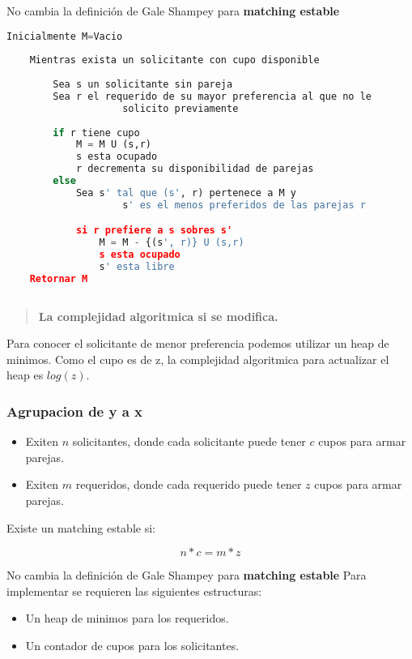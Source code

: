 \documentclass{article}
\begin{document}
No cambia la definición de Gale Shampey para \textbf{matching estable}

\begin{lstlisting}[language=Python, caption=Algoritmo de requeridos con cupos]
    Inicialmente M=Vacio
    
    Mientras exista un solicitante con cupo disponible
    
        Sea s un solicitante sin pareja
        Sea r el requerido de su mayor preferencia al que no le
                    solicito previamente
            
        if r tiene cupo 
            M = M U (s,r)
            s esta ocupado
            r decrementa su disponibilidad de parejas
        else
            Sea s' tal que (s', r) pertenece a M y 
                    s' es el menos preferidos de las parejas r

            si r prefiere a s sobres s'
                M = M - {(s', r)} U (s,r)
                s esta ocupado
                s' esta libre
    Retornar M
    
\end{lstlisting}    
\begin{quote}
    \textbf{La complejidad algoritmica si se modifica.}
\end{quote}
Para conocer el solicitante de menor preferencia podemos utilizar un heap de minimos. Como el cupo es de z, la complejidad algoritmica para actualizar el heap es \(log (z)\).

\subsubsection{Agrupacion de y a x}
\begin{itemize}
    \item Exiten \(n\) solicitantes, donde cada solicitante puede tener \(c\) cupos para armar parejas.
    \item Exiten \(m\) requeridos, donde cada requerido puede tener \(z\) cupos para armar parejas.
\end{itemize}


Existe un matching estable si:

\begin{equation} \label{eu_eqn}
    n*c=m*z
\end{equation}


No cambia la definición de Gale Shampey para \textbf{matching estable}
\newline
Para implementar se requieren las siguientes estructuras:
\begin{itemize}
    \item Un heap de minimos para los requeridos.
    \item Un contador de cupos para los solicitantes.
\end{itemize}
\end{document}

